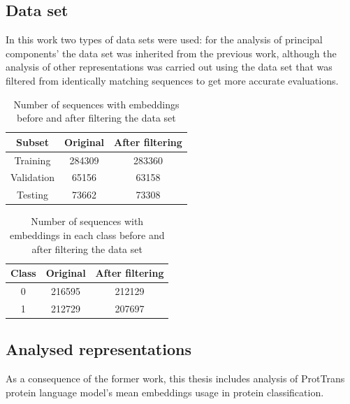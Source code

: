 \documentclass[12pt]{article}
\begin{document}
	\subsection{Data set}

	In this work two types of data sets were used: for the analysis of 
	principal components' the data set was inherited from the previous 
	work, although the analysis of other representations was carried 
	out using the data set that was filtered from identically matching 
	sequences to get more accurate evaluations.

	\begin{table}[h!]
		\caption{Number of sequences with embeddings before and after 
		filtering the data set}
		\vspace{0.2cm}
		\centering
		\begin{tabular}{ | c | c c | }
			\hline 
			Subset & Original & After filtering \\
			\hline 
			Training & 284309 & 283360 \\
			Validation & 65156 & 63158 \\
			Testing & 73662 & 73308 \\
			\hline    
		\end{tabular}
		\label{table:numberEmbeddings}
	\end{table}

	\begin{table}[h!]
		\caption{Number of sequences with embeddings in each class 
		before and after filtering the data set}
		\vspace{0.2cm}
		\centering
		\begin{tabular}{ | c | c c | }
			\hline 
			Class & Original & After filtering \\
			\hline 
			0 & 216595 & 212129 \\
			1 & 212729 & 207697 \\
			\hline    
		\end{tabular}
		\label{table:numberEmbeddingsClasses}
	\end{table}

	\newpage

	\subsection{Analysed representations}
	\label{analysedRepresentations}

	As a consequence of the former work, this thesis includes 
	analysis of ProtTrans protein language model's mean embeddings 
	usage in protein classification. 
\end{document}
